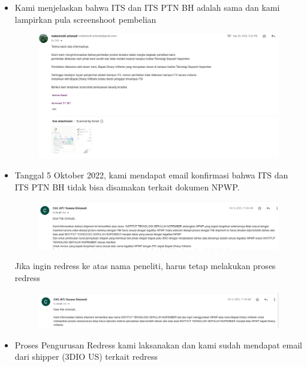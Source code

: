 \documentclass{article} %
\begin{document}
\begin{itemize}
		\item Kami menjelaskan bahwa ITS dan ITS PTN BH adalah sama dan kami lampirkan pula screenshoot pembelian

		\begin{figure}[!ht]
			\centering
			\includegraphics[width=400pt]{images/impor_9}
		\end{figure}

		\newpage
		\item Tanggal 5 Oktober 2022, kami mendapat email konfirmasi bahwa ITS dan ITS PTN BH tidak bisa disamakan terkait dokumen NPWP.

		\begin{figure}[!ht]
			\centering
			\includegraphics[width=400pt]{images/impor_10}
		\end{figure}

		Jika ingin redress ke atas nama peneliti, harus tetap melakukan proses redress

		\begin{figure}[!ht]
			\centering
			\includegraphics[width=400pt]{images/impor_11}
		\end{figure}

		\item Proses Pengurusan Redress kami laksanakan dan kami sudah mendapat email dari shipper (3DIO US) terkait redress


\end{itemize}
\end{document}
